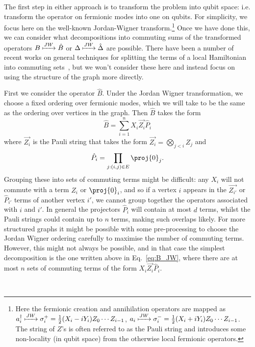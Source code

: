 \documentclass[11pt]{article}
\numberwithin{equation}{section}
\newcommand\equ[1] {\begin{equation}#1\end{equation}}
\renewcommand\( {\left(}
\renewcommand\) {\right)}
\begin{document}
The first step in either approach is to transform the problem into qubit space: i.e. transform the operator on fermionic modes into one on qubits. For simplicity, we focus here on the well-known Jordan-Wigner transform.\footnote{Here the fermionic creation and annihilation operators are mapped as $a_i^\dagger \xmapsto[]{JW} \sigma^{+}_i = \frac{1}{2}(X_i - iY_i)Z_0\cdots Z_{i-1}$, $a_i \xmapsto[]{JW} \sigma^{-}_i = \frac{1}{2}(X_i + iY_i)Z_0\cdots Z_{i-1}$. The string of $Z$'s is often referred to as the Pauli string and introduces some non-locality (in qubit space) from the otherwise local fermionic operators.} Once we have done this, we can consider what decompositions into commuting sums of the transformed operators $B \xmapsto[]{JW} \hat{B}$ or $\Delta \xmapsto[]{JW} \hat{\Delta}$ are possible. There have been a number of recent works on general techniques for splitting the terms of a local Hamiltonian into commuting sets~\cite{huggins2021efficient,crawford2021efficient,izmaylov2019revising,gokhale2019minimizing}, but we won't consider these here and instead focus on using the structure of the graph more directly. 


First we consider the operator $\hat{B}$. Under the Jordan Wigner transformation, we choose a fixed ordering over fermionic modes, which we will take to be the same as the ordering over vertices in the graph. Then $\hat{B}$ takes the form
\equ{\label{eq:B_JW}
    \hat{B} = \sum_{i=1}^n X_i \overrightarrow{Z_i} \hat{P}_i
}
where $\overrightarrow{Z_i}$ is the Pauli string that takes the form $\overrightarrow{Z_i} = \bigotimes_{j < i} Z_j$ and 
\equ{
    \hat{P}_i = \prod_{j:(i,j)\in E} \proj{0}_j.
}
Grouping these into sets of commuting terms might be difficult: any $X_i$ will not commute with a term $Z_i$ or $\proj{0}_i$, and so if a vertex $i$ appears in the $\overrightarrow{Z_{i'}}$ or $\hat{P}_{i'}$ terms of another vertex $i'$, we cannot group together the operators associated with $i$ and $i'$. In general the projectors $\hat{P}_i$ will contain at most $d$ terms, whilst the Pauli strings could contain up to $n$ terms, making such overlaps likely. For more structured graphs it might be possible with some pre-processing to choose the Jordan Wigner ordering carefully to maximise the number of commuting terms. However, this might not always be possible, and in that case the simplest decomposition is the one written above in Eq.~\eqref{eq:B_JW}, where there are at most $n$ sets of commuting terms of the form $X_i \overrightarrow{Z_i} \hat{P}_i$.

\ 
\end{document}
